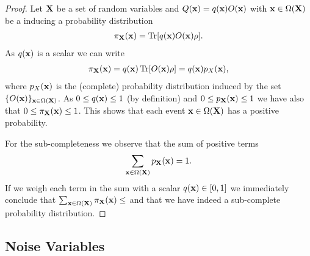 \begin{proof}
	Let $\mathbf{X}$ be a set of random variables and  $Q(\mathbf{x})= q(\mathbf{x})O(\mathbf{x})$ with $\mathbf{x}\in \Omega(\mathbf{X})$ be a \noisepunc inducing a probability distribution
	\begin{align}
		\pi_{\mathbf{X}}(\mathbf{x}) = \Tr [ q(\mathbf{x})O(\mathbf{x}) \rho].
	\end{align}
	As $q(\mathbf{x})$ is a scalar we can write
	\begin{align}
		\pi_{\mathbf{X}}(\mathbf{x}) = q(\mathbf{x}) \Tr [ O(\mathbf{x}) \rho] = q(\mathbf{x}) p_X(\mathbf{x}),
	\end{align}
	where $p_X(\mathbf{x})$ is the (complete) probability distribution induced by the set $\{ O(\mathbf{x}) \}_{\mathbf{x} \in \Omega(\mathbf{X})}$. As $0\leq q(\mathbf{x})\leq 1$ (by definition) and $0\leq p_{\mathbf{X}}(\mathbf{x})\leq 1$ we have also that $0\leq \pi_{\mathbf{X}}(\mathbf{x})\leq 1$. This shows that each event $\mathbf{x}\in \Omega(\mathbf{X})$ has a positive probability.

	For the sub-completeness we observe that the sum of positive terms
	\begin{align}
		\sum_{\mathbf{x} \in \Omega(\mathbf{X})} p_{\mathbf{X}}(\mathbf{x})=1.
	\end{align}
	If we weigh each term in the sum with a scalar $q(\mathbf{x}) \in [0,1]$ we immediately conclude that $\sum_{\mathbf{x} \in \Omega(\mathbf{X})} \pi_{\mathbf{X}} (\mathbf{x})\leq$ and that we have indeed a sub-complete probability distribution.
\end{proof}



\subsection{Noise Variables}


